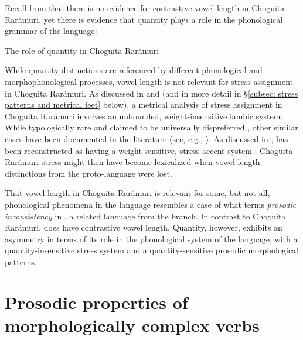 Recall from  that there is no evidence for contrastive vowel length in Choguita Rarámuri, yet there is evidence that quantity plays a role in the phonological grammar of the language:

\ea\label{ex:the role of quantity in CR}
 {The role of quantity in Choguita Rarámuri}
      	\z
   	\z

While quantity distinctions are referenced by different phonological and morphophonological processes, vowel length is not relevant for stress assignment in Choguita Rarámuri. As discussed in \citet{caballero2008choguita} and \citet{caballero2011morphologically} (and in more detail in §\ref{subsec: stress patterns and metrical feet} below), a metrical analysis of stress assignment in Choguita Rarámuri involves an unbounded, weight-insensitive iambic system. While typologically rare and claimed to be universally dispreferred \parencite{hayes1995metrical}, other similar cases have been documented in the literature (see, e.g., \citealt{graf2003emergent}). As discussed in ,  has been reconstructed as having a weight-sensitive, stress-accent system \parencite{munro1977towards}. Choguita Rarámuri stress might then have become lexicalized when vowel length distinctions from the proto-language were lost.

That vowel length in Choguita Rarámuri is relevant for some, but not all, phonological phenomena in the language resembles a case of what \citet{fitzgerald2012prosodic} terms \textit{prosodic inconsistency} in , a related  language from the  branch. In contrast to Choguita Rarámuri,  does have contrastive vowel length. Quantity, however, exhibits an asymmetry in terms of its role in the phonological system of the language, with a quantity-insensitive stress system and a quantity-sensitive prosodic morphological patterns.

\section{Prosodic properties of morphologically complex verbs}
\label{sec: prosodic properties of morphologically complex verbs}

